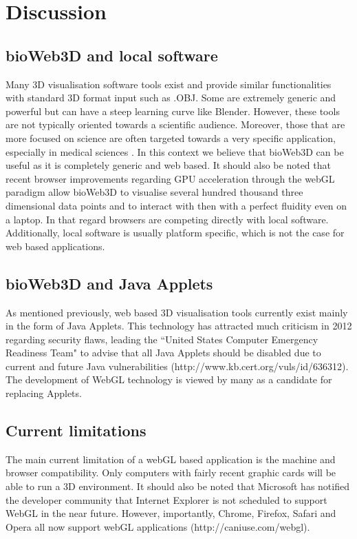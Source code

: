 \documentclass{bioinfo}
\begin{document}
\section{Discussion}
	\subsection{bioWeb3D and local software}
Many 3D visualisation software tools exist and provide similar functionalities with standard 3D format input such as .OBJ. Some are extremely generic and powerful but can have a steep learning curve like Blender. However, these tools are not typically oriented towards a scientific audience. Moreover, those that are more focused on science are often targeted towards a very specific application, especially in medical sciences \citep{Wang09}. In this context we believe that bioWeb3D can be useful as it is completely generic and web based. It should also be noted that recent browser improvements regarding GPU acceleration through the webGL paradigm allow bioWeb3D to visualise several hundred thousand three dimensional data points and to interact with then with a perfect fluidity even on a laptop. In that regard browsers are competing directly with local software. Additionally, local software is usually platform specific, which is not the case for web based applications.

	\subsection{bioWeb3D and Java Applets}
As mentioned previously, web based 3D visualisation tools currently exist mainly in the form of Java Applets. This technology has attracted much criticism in 2012 regarding security flaws, leading the ``United States Computer Emergency Readiness Team" to advise that all Java Applets should be disabled due to current and future Java vulnerabilities (http://www.kb.cert.org/vuls/id/636312). The development of WebGL technology is viewed by many as a candidate for replacing Applets. 

	\subsection{Current limitations}
The main current limitation of a webGL based application is the machine and browser compatibility. Only computers with fairly recent graphic cards will be able to run a 3D environment. It should also be noted that Microsoft has notified the developer community that Internet Explorer is not scheduled to support WebGL in the near future. However, importantly, Chrome, Firefox, Safari and Opera all now support webGL applications (http://caniuse.com/webgl).
\end{document}
